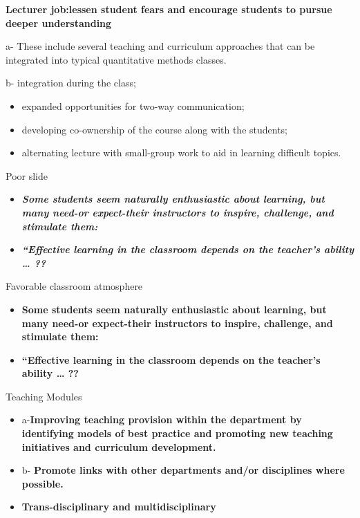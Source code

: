 \documentclass[
  ignorenonframetext,
]{beamer}
\begin{document}
\begin{frame}{}
\protect\hypertarget{section-4}{}
\textbf{Lecturer job:lessen student fears and encourage students to
pursue deeper understanding}

a- {These include several teaching and curriculum approaches that can be
integrated into typical quantitative methods classes.}

b- integration during the class;

\begin{itemize}[<+->]
\item
  expanded opportunities for two-way communication;
\item
  developing co-ownership of the course along with the students;
\item
  alternating lecture with small-group work to aid in learning difficult
  topics.
\end{itemize}
\end{frame}

\begin{frame}{Poor slide}
\protect\hypertarget{poor-slide}{}
\begin{itemize}[<+->]
\item
  {\textbf{\emph{Some students seem naturally enthusiastic about
  learning, but many need-or expect-their instructors to inspire,
  challenge, and stimulate them:}}}
\item
  {\textbf{\emph{``Effective learning in the classroom depends on the
  teacher's ability \ldots{} ??}}}
\end{itemize}
\end{frame}

\begin{frame}{Favorable classroom atmosphere}
\protect\hypertarget{favorable-classroom-atmosphere}{}
\begin{itemize}[<+->]
\item
  \textbf{Some students seem naturally enthusiastic about learning, but
  many need-or expect-their instructors to {inspire, challenge, and
  stimulate} them:}
\item
  {\textbf{``Effective learning in the classroom depends on the
  teacher's ability \ldots{} ??}}
\end{itemize}
\end{frame}

\begin{frame}{Teaching Modules}
\protect\hypertarget{teaching-modules}{}
\begin{itemize}
\item
  a-\textbf{Improving teaching provision within the department by
  identifying models of best practice and promoting new teaching
  initiatives and curriculum development.}
\item
  b- \textbf{Promote links with other departments and/or disciplines
  where possible.}
\item
  {\textbf{Trans-disciplinary and multidisciplinary}}
\end{itemize}
\end{frame}
\end{document}
